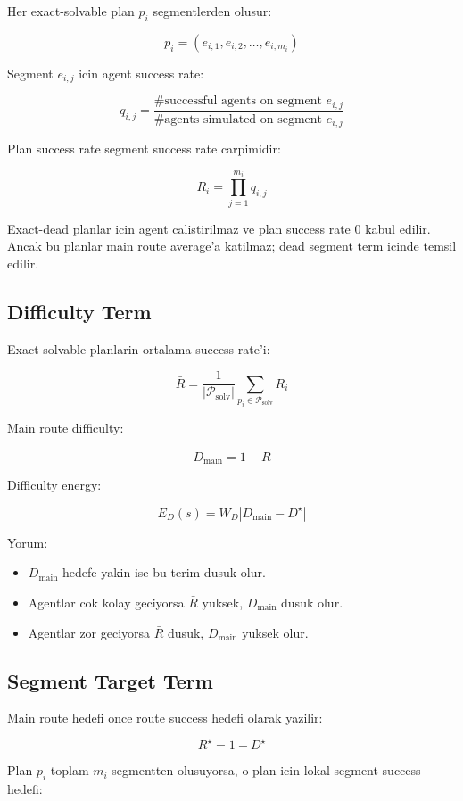 \documentclass[11pt]{article}
\begin{document}
Her exact-solvable plan $p_i$ segmentlerden olusur:

\[
p_i = (e_{i,1}, e_{i,2}, \ldots, e_{i,m_i})
\]

Segment $e_{i,j}$ icin agent success rate:

\[
q_{i,j}
=
\frac{
  \#\text{successful agents on segment } e_{i,j}
}{
  \#\text{agents simulated on segment } e_{i,j}
}
\]

Plan success rate segment success rate carpimidir:

\[
R_i
=
\prod_{j=1}^{m_i} q_{i,j}
\]

Exact-dead planlar icin agent calistirilmaz ve plan success rate $0$ kabul edilir.
Ancak bu planlar main route average'a katilmaz; dead segment term icinde temsil edilir.

\subsection{Difficulty Term}

Exact-solvable planlarin ortalama success rate'i:

\[
\bar{R}
=
\frac{1}{|\mathcal{P}_{\text{solv}}|}
\sum_{p_i \in \mathcal{P}_{\text{solv}}} R_i
\]

Main route difficulty:

\[
D_{\text{main}}
=
1 - \bar{R}
\]

Difficulty energy:

\[
E_D(s)
=
W_D
\left|
D_{\text{main}}
-
D^\star
\right|
\]

Yorum:

\begin{itemize}
  \item $D_{\text{main}}$ hedefe yakin ise bu terim dusuk olur.
  \item Agentlar cok kolay geciyorsa $\bar{R}$ yuksek, $D_{\text{main}}$ dusuk olur.
  \item Agentlar zor geciyorsa $\bar{R}$ dusuk, $D_{\text{main}}$ yuksek olur.
\end{itemize}

\subsection{Segment Target Term}

Main route hedefi once route success hedefi olarak yazilir:

\[
R^\star
=
1 - D^\star
\]

Plan $p_i$ toplam $m_i$ segmentten olusuyorsa, o plan icin lokal segment success hedefi:
\end{document}
